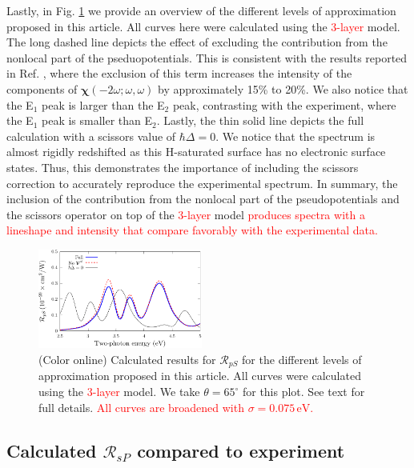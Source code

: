 \documentclass[prb,superscriptaddress,showpacs,twocolumn,letterpaper]{revtex4}
\newcommand{\correction}[1]{\textcolor{red}{#1}}
\begin{document}
Lastly, in Fig. \ref{fig:improvements} we provide an overview of the different
levels of approximation proposed in this article. All curves here were
calculated using the \correction{3-layer} model. The long dashed line depicts
the effect of excluding the contribution from the nonlocal part of the
pseduopotentials. This is consistent with the results reported in Ref.
, where the exclusion of this term increases the
intensity of the components of $\boldsymbol{\chi}(-2\omega;\omega,\omega)$ by
approximately 15\% to 20\%. We also notice that the E$_{1}$ peak is larger than
the E$_{2}$ peak, contrasting with the experiment, where the E$_{1}$ peak is
smaller than E$_{2}$. Lastly, the thin solid line depicts the full calculation
with a scissors value of $\hbar\Delta = 0$. We notice that the spectrum is
almost rigidly redshifted as this H-saturated surface has no electronic surface
states.\cite{andersonPRB15} Thus, this demonstrates the importance of including
the scissors correction to accurately reproduce the experimental spectrum. In
summary, the inclusion of the contribution from the nonlocal part of the
pseudopotentials and the scissors operator on top of the \correction{3-layer}
model
\correction{produces spectra with a lineshape and intensity that compare
favorably with the experimental data.} %

\begin{figure}[t]
\centering
\includegraphics[width=0.48\textwidth]{fig5}
\caption{(Color online) Calculated results for $\mathcal{R}_{pS}$ for the
different levels of approximation proposed in this article. All curves were
calculated using the \correction{3-layer} model. We take $\theta=65^{\circ}$ for
this plot. See text for full details.
\correction{All curves are broadened with $\sigma=0.075\,\text{eV}$.} %
\label{fig:improvements}}
\end{figure}


\subsection{Calculated \texorpdfstring{$\mathcal{R}_{sP}$}{RsP} compared to
experiment}\label{sec:RsP}
\end{document}

